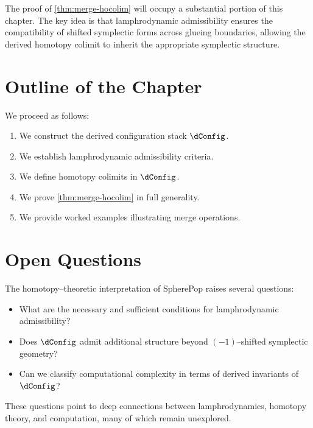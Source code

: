 The proof of \cref{thm:merge-hocolim} will occupy a substantial portion
of this chapter. The key idea is that lamphrodynamic admissibility
ensures the compatibility of shifted symplectic forms across glueing
boundaries, allowing the derived homotopy colimit to inherit the
appropriate symplectic structure.

\section{Outline of the Chapter}

We proceed as follows:
\begin{enumerate}
\item We construct the derived configuration stack $\dConfig$.
\item We establish lamphrodynamic admissibility criteria.
\item We define homotopy colimits in $\dConfig$.
\item We prove \cref{thm:merge-hocolim} in full generality.
\item We provide worked examples illustrating merge operations.
\end{enumerate}

\section{Open Questions}

The homotopy--theoretic interpretation of SpherePop raises several
questions:
\begin{itemize}
\item What are the necessary and sufficient conditions for lamphrodynamic
admissibility?
\item Does $\dConfig$ admit additional structure beyond $( -1 )$--shifted
symplectic geometry?
\item Can we classify computational complexity in terms of derived
invariants of $\dConfig$?
\end{itemize}
These questions point to deep connections between lamphrodynamics,
homotopy theory, and computation, many of which remain unexplored.

\newpage

